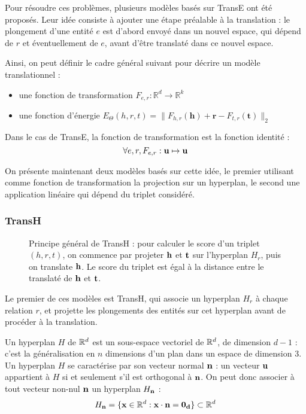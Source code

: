 Pour résoudre ces problèmes, plusieurs modèles basés sur TransE ont été proposés. Leur idée consiste à ajouter une étape préalable à la translation : le plongement d'une entité $e$ est d'abord envoyé dans un nouvel espace, qui dépend de $r$ et éventuellement de $e$, avant d'être translaté dans ce nouvel espace.

Ainsi, on peut définir le cadre général suivant pour décrire un modèle translationnel :
\begin{itemize}
    \item une fonction de transformation $F_{e, r} : \mathbb{R}^d \rightarrow \mathbb{R}^{k}$
    \item une fonction d'énergie $E_\Theta(h, r, t) = \| F_{h, r}(\mathbf{h}) + \mathbf{r} - F_{t, r}(\mathbf{t}) \|_2 $
\end{itemize}

Dans le cas de TransE, la fonction de transformation est la fonction identité :
\begin{equation}
    \forall e, r, F_{e, r} : \bf{u} \mapsto \bf{u}
\end{equation}

On présente maintenant deux modèles basés sur cette idée, le premier utilisant comme fonction de transformation la projection sur un hyperplan, le second une application linéaire qui dépend du triplet considéré.

\FloatBarrier


\subsubsection{TransH \cite{fu2014learning}}

\begin{figure}[hbt]
    \centering
    
    \caption[Principe général de TransH]{Principe général de TransH : pour calculer le score d'un triplet $(h, r, t)$, on commence par projeter $\bf{h}$ et $\bf{t}$ sur l'hyperplan $H_r$, puis on translate $\bf{h}$. Le score du triplet est égal à la distance entre le translaté de $\bf{h}$ et $\bf{t}$.}
    \label{fig:transh}
\end{figure}

Le premier de ces modèles est TransH, qui associe un hyperplan $H_r$ à chaque relation $r$, et projette les plongements des entités sur cet hyperplan avant de procéder à la translation. 

Un hyperplan $H$ de $\R^d$ est un sous-espace vectoriel de $\R^d$, de dimension $d-1$ : c'est la généralisation en $n$ dimensions d'un plan dans un espace de dimension 3. Un hyperplan $H$ se caractérise par son vecteur normal $\bf{n}$ : un vecteur $\bf{u}$ appartient à $H$ si et seulement s'il est orthogonal à $\bf{n}$. On peut donc associer à tout vecteur non-nul $\bf{n}$ un hyperplan $H_\bf{n}$ :
\begin{equation}
    H_\bf{n} = \{ \bf{x} \in \R^d : \bf{x \cdot n = 0_d} \} \subset \R^d
    \label{eq:kge-transh-hyperplane}
\end{equation}

